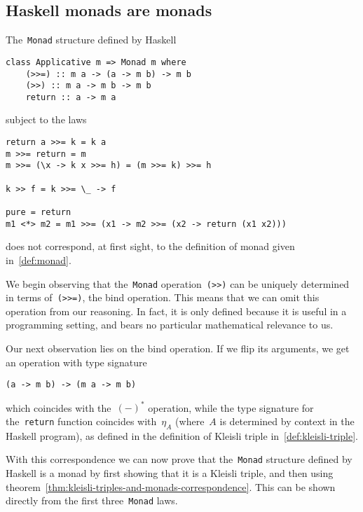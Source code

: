 \documentclass[../TFG.tex]{subfiles}
\begin{document}
\subsection{Haskell monads are monads}
The~\texttt{Monad} structure defined by Haskell
\begin{verbatim}
class Applicative m => Monad m where
    (>>=) :: m a -> (a -> m b) -> m b
    (>>) :: m a -> m b -> m b
    return :: a -> m a
\end{verbatim}
subject to the laws
\begin{verbatim}
return a >>= k = k a
m >>= return = m
m >>= (\x -> k x >>= h) = (m >>= k) >>= h

k >> f = k >>= \_ -> f

pure = return
m1 <*> m2 = m1 >>= (x1 -> m2 >>= (x2 -> return (x1 x2)))
\end{verbatim}
does not correspond, at first sight, to the definition of monad given
in~\ref{def:monad}.

We begin observing that the~\texttt{Monad}
operation~\texttt{(>>)} can be uniquely determined in terms
of~\texttt{(>>=)}, the bind operation.
This means that we can omit this operation from our reasoning. In fact, it is
only defined because it is useful in a programming setting, and bears no
particular mathematical relevance to us.

Our next observation lies on the bind operation. If we flip its arguments, we
get an operation with type signature
\begin{verbatim}
(a -> m b) -> (m a -> m b)
\end{verbatim}
which coincides with the~\((-)^{\ast}\) operation, while the type signature for
the~\texttt{return} function coincides with~\(\eta_{A}\)
(where~\(A\) is determined by context in the Haskell program), as defined in the
definition of Kleisli triple in~\ref{def:kleisli-triple}.

With this correspondence we can now prove that the~\texttt{Monad}
structure defined by Haskell is a monad by first showing that it is a Kleisli
triple, and then using
theorem~\ref{thm:kleisli-triples-and-monads-correspondence}. This can be shown
directly from the first three~\texttt{Monad} laws.
\end{document}
